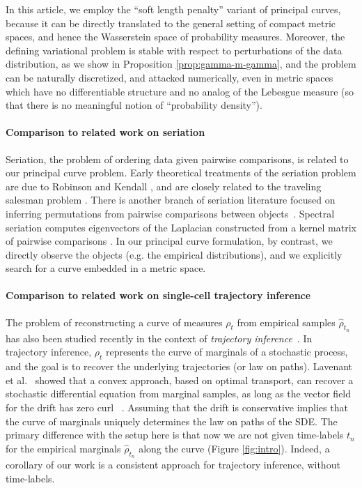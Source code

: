 \documentclass[aos, preprint]{imsart}
\theoremstyle{plain}
\theoremstyle{remark}
\begin{document}
In this article, we employ the ``soft length penalty'' variant of principal curves, because it can be directly translated to the general setting of compact metric spaces, and hence the Wasserstein space of probability measures.
Moreover, the defining variational problem is stable with respect to
perturbations of the data distribution, as we show in Proposition
\ref{prop:gamma-m-gamma}, and  the problem can be naturally
discretized, and attacked numerically, even in metric spaces which
have no differentiable structure and no analog of the Lebesgue measure
(so that there is no meaningful notion of ``probability density'').

\paragraph*{Comparison to related work on seriation}

Seriation, the problem of ordering data given pairwise comparisons,
is related to our principal curve problem.
Early theoretical treatments of the seriation problem are due to Robinson \cite{robinson1951method} and Kendall \cite{kendall1963statistical, kendall1969incidence}, and are closely related to the traveling salesman problem \cite{gertzen2012flinders}. There is another branch of seriation literature focused on inferring permutations from pairwise comparisons between objects~\cite{flammarion2019optimal, shah2016stochastically}. Spectral seriation computes eigenvectors of the Laplacian constructed from a kernel matrix of pairwise comparisons \cite{atkins_spectral_1998,giraud2023localization, janssen2022reconstruction, natik2021consistencyspectralseriation,zendehboodi2023exploring}.
In our principal curve formulation, by contrast, we directly observe the objects (e.g. the empirical distributions), and we explicitly search for a curve embedded in a metric space.


\paragraph*{Comparison to related work on single-cell trajectory inference}

The problem of reconstructing a curve of measures $\rho_t$ from empirical samples $\hat \rho_{t_n}$ has also been studied recently in the context of {\em trajectory inference}~\cite{lavenant2024towards,chizat2022trajectory}.
In trajectory inference, $\rho_t$ represents the curve of marginals of a stochastic process, and the goal is to recover the underlying trajectories (or law on paths). Lavenant et al.~\cite{lavenant2024towards} showed that a convex approach, based on optimal transport, can recover a stochastic differential equation from marginal samples, as long as the vector field for the drift has zero curl ~\cite{lavenant2024towards}.
Assuming that the drift is conservative implies that the curve of marginals uniquely determines the law on paths of the SDE.
The primary difference with the setup here is that now we are not given time-labels $t_n$ for the empirical marginals $\hat \rho_{t_n}$ along the curve (Figure \ref{fig:intro}). Indeed, a corollary of our work is a consistent approach for trajectory inference, without time-labels.
\end{document}
